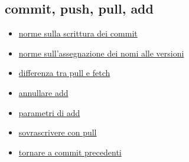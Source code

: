 \documentclass{article} \usepackage[textwidth=19cm,textheight=24cm]{geometry}
\begin{document}
\subsection{commit, push, pull, add}
\begin{itemize}
    \item \href{https://chris.beams.io/posts/git-commit/}{norme sulla scrittura dei commit}
    \item \href{https://semver.org/}{norme sull'assegnazione dei nomi alle versioni}
    \item \href{https://stackoverflow.com/questions/292357/what-is-the-difference-between-git-pull-and-git-fetch}
        {differenza tra pull e fetch}
    \item \href{https://stackoverflow.com/questions/348170/how-do-i-undo-git-add-before-commit?rq=1}
        {annullare add}
    \item \href{https://stackoverflow.com/questions/572549/difference-between-git-add-a-and-git-add?rq=1}
        {parametri di add}
    \item \href{https://stackoverflow.com/questions/1125968/how-do-i-force-git-pull-to-overwrite-local-files?rq=1}
        {sovrascrivere con pull}
    \item \href{https://stackoverflow.com/questions/4114095/how-do-i-revert-a-git-repository-to-a-previous-commit?rq=1}
        {tornare a commit precedenti}
\end{itemize}
\end{document}

